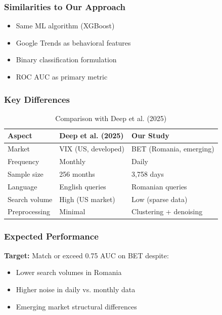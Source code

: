 \documentclass[12pt,a4paper]{article}
\begin{document}
\subsubsection{Similarities to Our Approach}

\begin{itemize}
    \item Same ML algorithm (XGBoost)
    \item Google Trends as behavioral features
    \item Binary classification formulation
    \item ROC AUC as primary metric
\end{itemize}

\subsubsection{Key Differences}

\begin{table}[h]
\centering
\begin{tabular}{lll}
\hline
\textbf{Aspect} & \textbf{Deep et al. (2025)} & \textbf{Our Study} \\
\hline
Market & VIX (US, developed) & BET (Romania, emerging) \\
Frequency & Monthly & Daily \\
Sample size & 256 months & 3,758 days \\
Language & English queries & Romanian queries \\
Search volume & High (US market) & Low (sparse data) \\
Preprocessing & Minimal & Clustering + denoising \\
\hline
\end{tabular}
\caption{Comparison with Deep et al. (2025)}
\end{table}

\subsubsection{Expected Performance}

\textbf{Target:} Match or exceed 0.75 AUC on BET despite:
\begin{itemize}
    \item Lower search volumes in Romania
    \item Higher noise in daily vs. monthly data
    \item Emerging market structural differences
\end{itemize}
\end{document}
